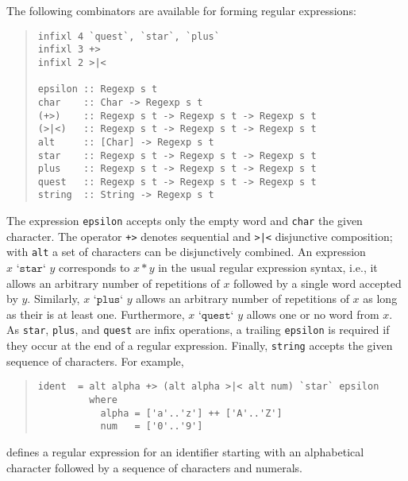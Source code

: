 \documentclass{report}
\newcommand{\code}[1]{\texttt{#1}}
\begin{document}
The following combinators are available for forming regular expressions:
%
\begin{quote}
\begin{verbatim}
infixl 4 `quest`, `star`, `plus`
infixl 3 +>
infixl 2 >|<

epsilon :: Regexp s t
char    :: Char -> Regexp s t
(+>)    :: Regexp s t -> Regexp s t -> Regexp s t
(>|<)   :: Regexp s t -> Regexp s t -> Regexp s t
alt     :: [Char] -> Regexp s t
star    :: Regexp s t -> Regexp s t -> Regexp s t
plus    :: Regexp s t -> Regexp s t -> Regexp s t
quest   :: Regexp s t -> Regexp s t -> Regexp s t
string  :: String -> Regexp s t
\end{verbatim}
\end{quote}
%
The expression \code{epsilon} accepts only the empty word and \code{char} the
given character.  The operator \code{+>} denotes sequential and \code{>|<}
disjunctive composition; with \code{alt} a set of characters can be
disjunctively combined.  An expression \(x\code{ `star` }y\) corresponds to
\(x{*}y\) in the usual regular expression syntax, i.e., it allows an arbitrary
number of repetitions of $x$ followed by a single word accepted by $y$.
Similarly, \(x\code{ `plus` }y\) allows an arbitrary number of repetitions of
$x$ as long as their is at least one.  Furthermore, \(x\code{ `quest` }y\)
allows one or no word from $x$.  As \code{star}, \code{plus}, and \code{quest}
are infix operations, a trailing \code{epsilon} is required if they occur at
the end of a regular expression.  Finally, \code{string} accepts the given
sequence of characters.  For example,
%
\begin{quote}
\begin{verbatim}
ident  = alt alpha +> (alt alpha >|< alt num) `star` epsilon
         where
           alpha = ['a'..'z'] ++ ['A'..'Z']
           num   = ['0'..'9']
\end{verbatim}
\end{quote}
%
defines a regular expression for an identifier starting with an alphabetical
character followed by a sequence of characters and numerals.
\end{document}
